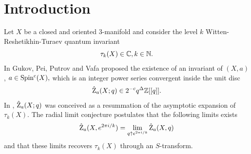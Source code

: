 \date{}



\maketitle

\section*{Introduction} \label{introduction}

Let $X$ be a closed and oriented $3$-manifold and consider the level $k$ Witten-Reshetikhin-Turaev quantum invariant \cite{ReshetikhinTuraev90,ReshetikhinTuraev91}  \begin{equation} \label{eq:WRTinvariant} \tau_k(X)  \in \mathbb{C}, k \in \mathbb{N}.\end{equation} 
In \cite{GukovPeiPutrovVada18} Gukov, Pei, Putrov and Vafa proposed the existence of an invariant of $(X,a)$, $a \in \operatorname{Spin^c}(X),$  which is an integer power series  convergent inside the unit disc \begin{equation} \label{eq:GPPVinvariant} \hat{\operatorname{Z}}_a(X;q) \in 2^{-c} q^{\Delta} \mathbb{Z}[[q]]. \end{equation}   In \cite{GukovMarinoPutrov}, $\hat{\operatorname{Z}}_a(X;q)$ was conceived as a resummation of the asymptotic expansion of $\tau_k(X)$. The radial limit conjecture \cite{ChengChunFerrariGukovHarrison18, GukovCiprian19,GukovPeiPutrovVada18} postulates that the following limits exists $$ \hat{\operatorname{Z}}_a(X,e^{2\pi i/k})=\lim_{q \uparrow e^{2\pi i/k}} \hat{\operatorname{Z}}_a(X,q)$$
 and that these limits recovers $\tau_k(X)$  through an $S$-transform. 



